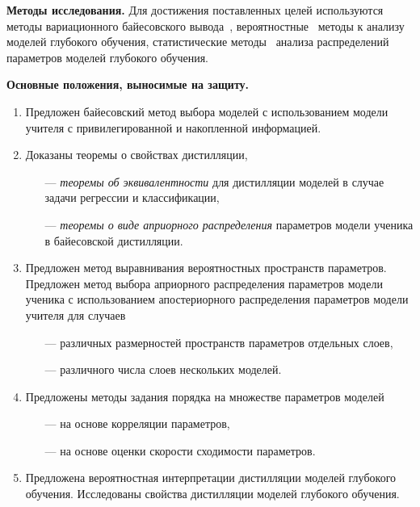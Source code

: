 \vspace{0.5cm}
\textbf{Методы исследования.} Для достижения поставленных целей используются методы вариационного байесовского вывода~\cite{mackay2002,bishop2006}, вероятностные~\cite{shiriyaev1980} методы к анализу моделей глубокого обучения, статистические методы~\cite{kobzar2012,bishop2006} анализа распределений параметров моделей глубокого обучения.

\vspace{0.5cm}
\textbf{Основные положения, выносимые на защиту.}
\vspace{0.3cm}
\begin{enumerate}
    \item Предложен байесовский метод выбора моделей с использованием модели учителя с привилегированной и накопленной информацией.
    \item Доказаны теоремы о свойствах дистилляции, 
    \begin{itemize}
        \item[---] \emph{теоремы об эквивалентности} для дистилляции моделей в случае задачи регрессии и классификации,
        \item[---] \emph{теоремы о виде априорного распределения} параметров модели ученика в байесовской дистилляции.
    \end{itemize}
    \item Предложен метод выравнивания вероятностных пространств параметров. Предложен метод выбора априорного распределения параметров модели ученика с использованием апостериорного распределения параметров модели учителя для случаев
    \begin{itemize}
        \item[---] различных размерностей пространств параметров отдельных слоев,
        \item[---] различного числа слоев нескольких моделей.
    \end{itemize}
    \item Предложены методы задания порядка на множестве параметров моделей
    \begin{itemize}
        \item[---] на основе корреляции параметров,
        \item[---] на основе оценки скорости сходимости параметров.
    \end{itemize}
    \item Предложена вероятностная интерпретации дистилляции моделей глубокого обучения. Исследованы свойства дистилляции моделей глубокого обучения.
\end{enumerate}

